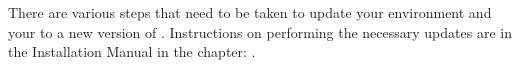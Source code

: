 There are various steps that need to be taken to update your environment and your \gdprojects{} to a new version of \app{}. Instructions on performing the necessary updates are in the Installation Manual in the chapter: . 












